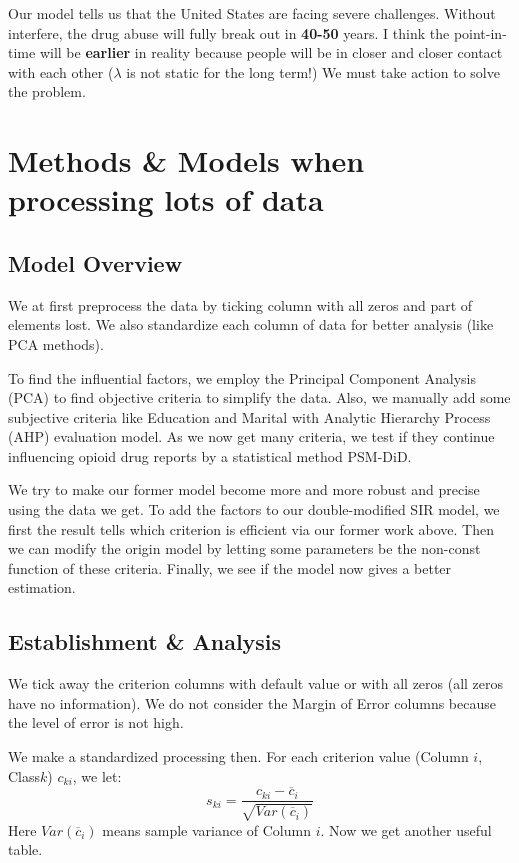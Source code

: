 \documentclass{mcmthesis}
\begin{document}
Our model tells us that the United States are facing severe challenges. Without interfere,  the drug abuse will fully break out in \textbf{40-50} years. I think the point-in-time will be \textbf{earlier} in reality because people will be in closer and closer contact with each other ($\lambda$ is not static for the long term!) We must take action to solve the problem. 



\section{Methods \& Models when processing lots of data}
\subsection{Model Overview}
We at first preprocess the data by ticking column with all zeros and part of elements lost. We also standardize each column of data for better analysis (like PCA methods).

To find the influential factors, we employ the Principal Component Analysis (PCA) to find objective criteria to simplify the data. Also, we manually add some subjective criteria like Education and Marital with Analytic Hierarchy Process (AHP) evaluation model. As we now get many criteria, we test if they continue influencing opioid drug reports by a statistical method PSM-DiD. 

We try to make our former model become more and more robust and precise using the data we get.  To add the factors to our double-modified SIR model, we first the result tells which criterion is efficient via our former work above. Then we can modify the origin model by letting some parameters be the non-const function of these criteria. Finally, we see if the model now gives a better estimation.
\subsection{Establishment \& Analysis}
We tick away the criterion columns with default value or with all zeros (all zeros have no information). We do not consider the Margin of Error columns because the level of error is not high.

We make a standardized processing then. For each criterion value (Column $i$, Class$k$) $c_{ki}$, we let:
$$s_{ki}=\dfrac{c_{ki}-\overline{c}_i}{\sqrt{Var(\overline{c}_i)}}$$
Here $Var(\overline{c}_i)$ means sample variance of Column $i$. Now we get another useful table.
\end{document}
